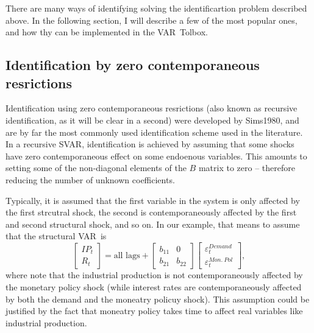 \documentclass[10pt]{article}
\begin{document}
There are many ways of identifying solving the identificartion problem
described above. In the following section, I will describe a few of the most
popular ones, and how thy can be implemented in the VAR\ Tolbox.

\subsection{Identification by zero contemporaneous resrictions}

Identification using zero contemporaneous resrictions (also known as
recursive identification, as it will be clear in a second) were developed by
Sims1980, and are by far the most commonly used identification scheme used
in the literature. In a recursive SVAR, identification is achieved by
assuming that some shocks have zero contemporaneous effect on some endoenous
variables. This amounts to setting some of the non-diagonal elements of the $%
B$ matrix to zero -- therefore reducing the number of unknown coefficients.

Typically, it is assumed that the first variable in the system is only
affected by the first strcutral shock, the second is contemporaneously
affected by the first and second structural shock, and so on. In our
example, that means to assume that the structural VAR\ is 
\begin{equation}
\begin{bmatrix}
IP_{t} \\ 
R_{t}%
\end{bmatrix}%
=\text{all lags}+\left[ 
\begin{array}{cc}
b_{11} & 0 \\ 
b_{21} & b_{22}%
\end{array}%
\right] 
\begin{bmatrix}
\varepsilon _{t}^{Demand} \\ 
\varepsilon _{t}^{Mon.\ Pol}%
\end{bmatrix}%
,
\end{equation}%
where note that the industrial production is not contemporaneously affected
by the monetary policy shock (while interest rates are contemporaneously
affected by both the demand and the moneatry policuy shock). This assumption
could be justified by the fact that moneatry policy takes time to affect
real variables like industrial production.
\end{document}

